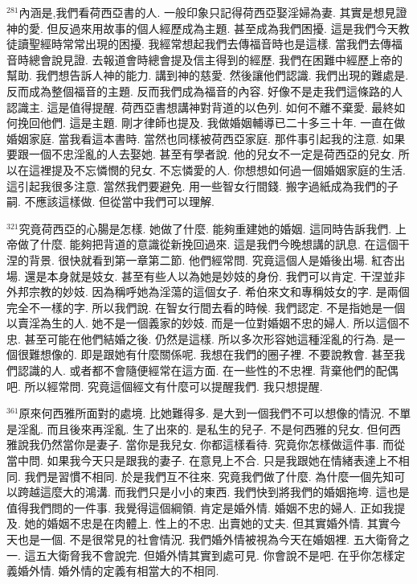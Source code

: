 \documentclass{book}
\begin{document}
$^{281}$內涵是,我們看荷西亞書的人.
一般印象只記得荷西亞娶淫婦為妻.
其實是想見證神的愛.
但反過來用故事的個人經歷成為主題.
甚至成為我們困擾.
這是我們今天教徒讀聖經時常常出現的困擾.
我經常想起我們去傳福音時也是這樣.
當我們去傳福音時總會說見證.
去報道會時總會提及信主得到的經歷.
我們在困難中經歷上帝的幫助.
我們想告訴人神的能力.
講到神的慈愛.
然後讓他們認識.
我們出現的難處是.
反而成為整個福音的主題.
反而我們成為福音的內容.
好像不是走我們這條路的人認識主.
這是值得提醒.
荷西亞書想講神對背道的以色列.
如何不離不棄愛.
最終如何挽回他們.
這是主題.
剛才律師也提及.
我做婚姻輔導已二十多三十年.
一直在做婚姻家庭.
當我看這本書時.
當然也同樣被荷西亞家庭.
那件事引起我的注意.
如果要跟一個不忠淫亂的人去娶她.
甚至有學者說.
他的兒女不一定是荷西亞的兒女.
所以在這裡提及不忘憐憫的兒女.
不忘憐愛的人.
你想想如何過一個婚姻家庭的生活.
這引起我很多注意.
當然我們要避免.
用一些智女行間錢.
搬字過紙成為我們的子嗣.
不應該這樣做.
但從當中我們可以理解.

$^{321}$究竟荷西亞的心腸是怎樣.
她做了什麼.
能夠重建她的婚姻.
這同時告訴我們.
上帝做了什麼.
能夠把背道的意識從新挽回過來.
這是我們今晚想講的訊息.
在這個干涅的背景.
很快就看到第一章第二節.
他們經常問.
究竟這個人是婚後出場.
紅杏出場.
還是本身就是妓女.
甚至有些人以為她是妙妓的身份.
我們可以肯定.
干涅並非外邦宗教的妙妓.
因為稱呼她為淫蕩的這個女子.
希伯來文和專稱妓女的字.
是兩個完全不一樣的字.
所以我們說.
在智女行間去看的時候.
我們認定.
不是指她是一個以賣淫為生的人.
她不是一個義家的妙妓.
而是一位對婚姻不忠的婦人.
所以這個不忠.
甚至可能在他們結婚之後.
仍然是這樣.
所以多次形容她這種淫亂的行為.
是一個很難想像的.
即是跟她有什麼關係呢.
我想在我們的圈子裡.
不要說教會.
甚至我們認識的人.
或者都不會隨便經常在這方面.
在一些性的不忠裡.
背棄他們的配偶吧.
所以經常問.
究竟這個經文有什麼可以提醒我們.
我只想提醒.

$^{361}$原來何西雅所面對的處境.
比她難得多.
是大到一個我們不可以想像的情況.
不單是淫亂.
而且後來再淫亂.
生了出來的.
是私生的兒子.
不是何西雅的兒女.
但何西雅說我仍然當你是妻子.
當你是我兒女.
你都這樣看待.
究竟你怎樣做這件事.
而從當中問.
如果我今天只是跟我的妻子.
在意見上不合.
只是我跟她在情緒表達上不相同.
我們是習慣不相同.
於是我們互不往來.
究竟我們做了什麼.
為什麼一個先知可以跨越這麼大的鴻溝.
而我們只是小小的東西.
我們快到將我們的婚姻拖垮.
這也是值得我們問的一件事.
我覺得這個綱領.
肯定是婚外情.
婚姻不忠的婦人.
正如我提及.
她的婚姻不忠是在肉體上.
性上的不忠.
出賣她的丈夫.
但其實婚外情.
其實今天也是一個.
不是很常見的社會情況.
我們婚外情被視為今天在婚姻裡.
五大衛脅之一.
這五大衛脅我不會說完.
但婚外情其實到處可見.
你會說不是吧.
在乎你怎樣定義婚外情.
婚外情的定義有相當大的不相同.
\end{document}
